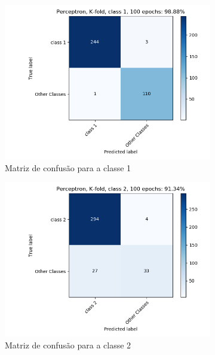 \documentclass[paper=a4, fontsize=11pt]{scrartcl}
\numberwithin{equation}{section}		%
\numberwithin{figure}{section}			%
\numberwithin{table}{section}				%
\begin{document}
	\begin{figure}[h!]
		\begin{subfigure}{.5\textwidth}
			\centering
			\includegraphics[width=\linewidth]{img/q3_fig_kfold_classe1.png}
			\caption{Matriz de confusão para a classe 1}
			\label{fig:q1grau2}
		\end{subfigure}%
		\begin{subfigure}{.5\textwidth}
			\centering
			\includegraphics[width=\linewidth]{img/q3_fig_kfold_classe2.png}
			\caption{Matriz de confusão para a classe 2}
			\label{fig:q1_grau3}
		\end{subfigure}
		\begin{subfigure}{.5\textwidth}
			\centering

\end{subfigure}
\end{figure}
\end{document}
